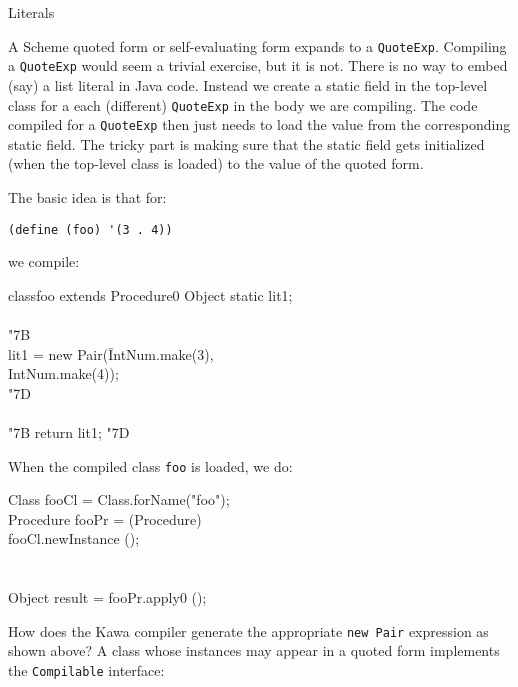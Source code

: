 \documentclass[twocolumn]{article}
\makeatletter
\def\section{\@startsection {section}{1}{\z@}
   {14pt plus 2pt minus 2pt}{12pt plus 2pt minus 2pt} {\large\bf}}
\newcommand{\LBr}{\char"7B}
\newcommand{\RBr}{\char"7D}
\newcommand{\Tab}{\>}
\makeatother
\begin{document}
\section{Literals}

A Scheme quoted form or self-evaluating form expands to a {\tt QuoteExp}.
Compiling a {\tt QuoteExp} would seem a trivial exercise, but it is not.
There is no way to embed (say) a list literal in Java code.
Instead we create a static field in the top-level class
for a each (different) {\tt QuoteExp} in the body we are compiling.
The code compiled for a {\tt QuoteExp} then just needs
to load the value from the corresponding static field.
The tricky part is making sure that the static field gets
initialized (when the top-level class is loaded) to the
value of the quoted form.

The basic idea is that for:

\begin{verbatim}
(define (foo) '(3 . 4))
\end{verbatim}

we compile:

\begin{ClassNoDots}{class}{foo}{ extends Procedure0}
Object static lit1;\\
\\
\LBr {}\\
\Tab lit1 = new Pair(\pushtabs\=IntNum.make(3),\\
\Tab\Tab\poptabs IntNum.make(4));\\
\RBr\\
\\
{\LBr} return lit1; {\RBr}\\
\end{ClassNoDots}

When the compiled class {\tt foo} is loaded, we do:

\begin{Code}
Class fooCl = Class.forName("foo");\\
Procedure fooPr = (Procedure)\\
\Tab fooCl.newInstance ();\\
\hbox{ }\\
\\
Object result = fooPr.apply0 ();\\
\end{Code}

How does the Kawa compiler generate the appropriate {\tt new Pair}
expression as shown above?  A class whose instances may appear
in a quoted form implements the {\tt Compilable} interface:
\end{document}
